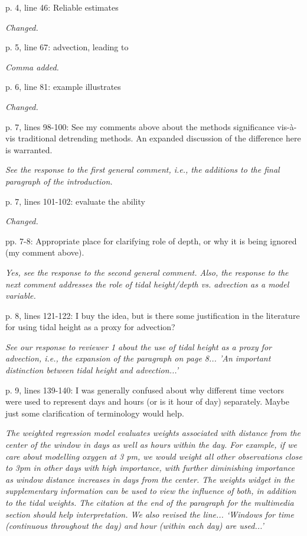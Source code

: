 \documentclass[letterpaper,12pt]{article}\usepackage[]{graphicx}\usepackage[]{color}
\begin{document}
p. 4, line 46: Reliable estimates

{\it Changed.}

p. 5, line 67: advection, leading to

{\it Comma added.}

p. 6, line 81: example illustrates

{\it Changed.}

p. 7, lines 98-100: See my comments above about the methods significance vis-à-vis traditional detrending methods. An expanded discussion of the difference here is warranted.

{\it See the response to the first general comment, i.e., the additions to the final paragraph of the introduction.}

p. 7, lines 101-102: evaluate the ability

{\it Changed.}

pp. 7-8: Appropriate place for clarifying role of depth, or why it is being ignored (my comment above).

{\it Yes, see the response to the second general comment.  Also, the response to the next comment addresses the role of tidal height/depth vs. advection as a model variable.}

p. 8, lines 121-122: I buy the idea, but is there some justification in the literature for using tidal height as a proxy for advection?

{\it See our response to reviewer 1 about the use of tidal height as a proxy for advection, i.e., the expansion of the paragraph on page 8... 'An important distinction between tidal height and advection...'}

p. 9, lines 139-140: I was generally confused about why different time vectors were used to represent days and hours (or is it hour of day) separately. Maybe just some clarification of terminology would help.

{\it The weighted regression model evaluates weights associated with distance from the center of the window in days as well as hours within the day.  For example, if we care about modelling oxygen at 3 pm, we would weight all other observations close to 3pm in other days with high importance, with further diminishing importance as window distance increases in days from the center.  The weights widget in the supplementary information can be used to view the influence of both, in addition to the tidal weights.  The citation at the end of the paragraph for the multimedia section should help interpretation.  We also revised the line... `Windows for time (continuous throughout the day) and hour (within each day) are used...'
}
\end{document}
